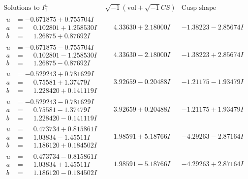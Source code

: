 \documentclass[1p]{elsarticle_modified}
\theoremstyle{definition}
\newcommand{\I}{\sqrt{-1}}
\begin{document}
$$\begin{array}{c|c|c}  
\text{Solutions to }I^u_{1}& \I (\text{vol} + \sqrt{-1}CS) & \text{Cusp shape}\\
 \hline 
\begin{aligned}
u &= -0.671875 + 0.755704 I \\
a &= \phantom{-}0.102801 + 1.258530 I \\
b &= \phantom{-}1.26875 + 0.87692 I\end{aligned}
 & \phantom{-}4.33630 + 2.18000 I & -1.38223 - 2.85674 I \\ \hline\begin{aligned}
u &= -0.671875 - 0.755704 I \\
a &= \phantom{-}0.102801 - 1.258530 I \\
b &= \phantom{-}1.26875 - 0.87692 I\end{aligned}
 & \phantom{-}4.33630 - 2.18000 I & -1.38223 + 2.85674 I \\ \hline\begin{aligned}
u &= -0.529243 + 0.781629 I \\
a &= \phantom{-}0.75581 + 1.37479 I \\
b &= \phantom{-}1.228420 + 0.141119 I\end{aligned}
 & \phantom{-}3.92659 - 0.20488 I & -1.21175 - 1.93479 I \\ \hline\begin{aligned}
u &= -0.529243 - 0.781629 I \\
a &= \phantom{-}0.75581 - 1.37479 I \\
b &= \phantom{-}1.228420 - 0.141119 I\end{aligned}
 & \phantom{-}3.92659 + 0.20488 I & -1.21175 + 1.93479 I \\ \hline\begin{aligned}
u &= \phantom{-}0.473734 + 0.815861 I \\
a &= \phantom{-}1.03834 - 1.45511 I \\
b &= \phantom{-}1.186120 + 0.184502 I\end{aligned}
 & \phantom{-}1.98591 + 5.18766 I & -4.29263 - 2.87164 I \\ \hline\begin{aligned}
u &= \phantom{-}0.473734 - 0.815861 I \\
a &= \phantom{-}1.03834 + 1.45511 I \\
b &= \phantom{-}1.186120 - 0.184502 I\end{aligned}
 & \phantom{-}1.98591 - 5.18766 I & -4.29263 + 2.87164 I \\ \hline\begin{aligned}

\end{aligned}
\end{array}$$
\end{document}
